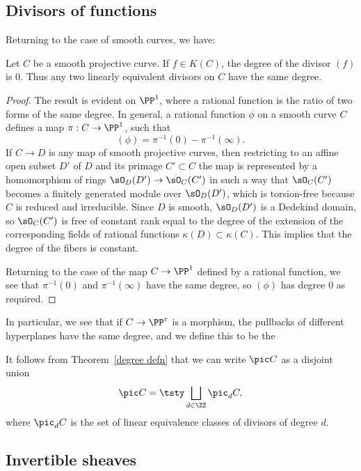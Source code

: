 \subsection*{Divisors of functions}

Returning to the case of smooth curves, we have:

\begin{theorem}\label{degree defn}
Let $C$ be a smooth projective curve. If $f\in K(C)$, 
the degree of the divisor $(f)$ is $0$. 
Thus any two linearly equivalent divisors on $C$ have the
same degree.
\end{theorem}

\begin{proof}
 The result is evident on $\PP^1$, where a rational 
function is the ratio of two forms of the same degree. In general, a rational function $\phi$ on a smooth curve $C$ defines a map $\pi : C \to \PP^1$, such that
$$
(\phi) = \pi^{-1}(0) - \pi^{-1}(\infty).
$$
If $C\to D$ is any map of smooth projective curves, then restricting to an affine open subset $D'$ of $D$ and its primage
$C'\subset C$
the map is represented by a homomorphism of rings $\sO_D(D') \to \sO_C(C')$ in such a way that $\sO_C(C')$ becomes a finitely generated
module over $\sO_D(D')$, which is torsion-free because $C$ is reduced and irreducible. Since $D$ is smooth,
$\sO_D(D')$ is a Dedekind domain, so $\sO_C(C')$ is free of constant rank equal to the degree of the extension of the corresponding
 fields of rational functions $\kappa(D)\subset \kappa(C)$. This implies that the degree of the fibers is constant.
 
 Returning to the case of the map $C\to \PP^1$ defined by a rational function, we see that $\pi^{-1}(0)$ and $ \pi^{-1}(\infty)$
 have the same degree, so $(\phi)$ has degree 0 as required.
\end{proof}

In particular, we see that if $C\to \PP^{r}$ is a morphism, 
the pullbacks of different hyperplanes
have the same degree, and we define this to be the 
%

It follows from Theorem~\ref{degree defn} that we can write $\pic C$ as a disjoint union
$$
\pic C = \tsty\bigsqcup\limits_{d \in \ZZ} \pic_d C,
$$
where $\pic_d C$ is the set of linear equivalence classes of divisors of degree $d$.

\subsection*{Invertible sheaves}%

